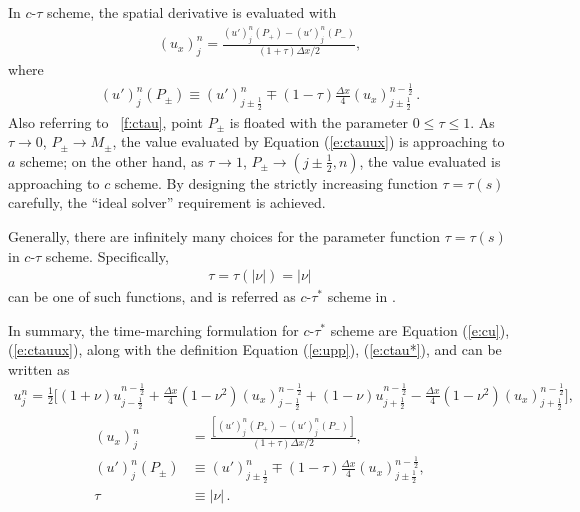 \documentclass[letterpaper,12pt,dvips]{article}
\numberwithin{equation}{section}
\begin{document}
In $c$-$\tau$ scheme, the spatial derivative is evaluated with 
\begin{align}
  (u_x)_j^n = 
    \frac{(u')_j^n(P_+) - (u')_j^n(P_-)}
         {(1+\tau)\Delta x/2}, \label{e:ctauux}
\end{align}
where
\begin{align}
  (u')_j^n(P_{\pm}) \equiv 
        (u')_{j\pm\frac{1}{2}}^n 
    \mp (1-\tau)\frac{\Delta x}{4}(u_x)_{j\pm\frac{1}{2}}^{n-\frac{1}{2}}
  \,. \label{e:upp}
\end{align}
Also referring to \figurename~\ref{f:ctau}, point $P_{\pm}$ is floated 
with the parameter $0\le\tau\le1$.
As $\tau\rightarrow0$, $P_{\pm}\rightarrow M_{\pm}$, the value evaluated 
by Equation (\ref{e:ctauux}) is approaching to $a$ scheme; on the other 
hand, as $\tau\rightarrow1$, $P_{\pm}\rightarrow(j\pm\frac{1}{2},n)$, the 
value evaluated is approaching to $c$ scheme.
By designing the strictly increasing function $\tau = \tau(s)$ 
carefully\cite{b:chang03}, the ``ideal solver'' requirement is achieved.

Generally, there are infinitely many choices for the parameter function 
$\tau=\tau(s)$ in $c$-$\tau$ scheme.
Specifically, 
\begin{align}
  \tau = \tau(|\nu|) = |\nu| \label{e:ctau*}
\end{align}
can be one of such functions, and 
is referred as $c$-$\tau^*$ scheme in \cite{b:chang02, b:chang03}.

In summary, the time-marching formulation for $c$-$\tau^*$ scheme are 
Equation (\ref{e:cu}), (\ref{e:ctauux}), along with the definition 
Equation (\ref{e:upp}), (\ref{e:ctau*}), and can be written as
\begin{align*}
  u_j^n = \frac{1}{2}\Big[
      (1+\nu)u_{j-\frac{1}{2}}^{n-\frac{1}{2}} 
    + \frac{\Delta x}{4}(1-\nu^2)(u_x)_{j-\frac{1}{2}}^{n-\frac{1}{2}}
    + (1-\nu)u_{j+\frac{1}{2}}^{n-\frac{1}{2}}
    - \frac{\Delta x}{4}(1-\nu^2)(u_x)_{j+\frac{1}{2}}^{n-\frac{1}{2}}
  \Big], 
\end{align*}
\begin{align*}
  (u_x)_j^n &= 
    \frac{\left[(u')_j^n(P_+) - (u')_j^n(P_-)\right]}
         {(1+\tau)\Delta x/2}, \\
  (u')_j^n(P_{\pm}) &\equiv 
        (u')_{j\pm\frac{1}{2}}^n 
    \mp (1-\tau)\frac{\Delta x}{4}
        (u_x)_{j\pm\frac{1}{2}}^{n-\frac{1}{2}}, \\
  \tau &\equiv |\nu|\,.
\end{align*}
\end{document}

